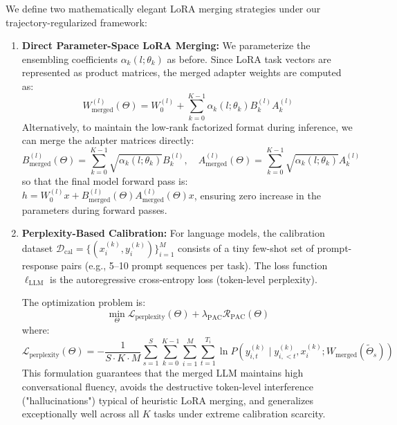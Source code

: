 We define two mathematically elegant LoRA merging strategies under our trajectory-regularized framework:
\begin{enumerate}
    \item \textbf{Direct Parameter-Space LoRA Merging:}
    We parameterize the ensembling coefficients $\alpha_k(l; \theta_k)$ as before. Since LoRA task vectors are represented as product matrices, the merged adapter weights are computed as:
    \begin{equation}
    W_{\text{merged}}^{(l)}(\Theta) = W_0^{(l)} + \sum_{k=0}^{K-1} \alpha_k(l; \theta_k) B_k^{(l)} A_k^{(l)}
    \end{equation}
    Alternatively, to maintain the low-rank factorized format during inference, we can merge the adapter matrices directly:
    \begin{equation}
    B_{\text{merged}}^{(l)}(\Theta) = \sum_{k=0}^{K-1} \sqrt{\alpha_k(l; \theta_k)} B_k^{(l)}, \quad A_{\text{merged}}^{(l)}(\Theta) = \sum_{k=0}^{K-1} \sqrt{\alpha_k(l; \theta_k)} A_k^{(l)}
    \end{equation}
    so that the final model forward pass is: $h = W_0^{(l)} x + B_{\text{merged}}^{(l)}(\Theta) A_{\text{merged}}^{(l)}(\Theta) x$, ensuring zero increase in the parameters during forward passes.
    \item \textbf{Perplexity-Based Calibration:}
    For language models, the calibration dataset $\mathcal{D}_{\text{cal}} = \{(x_i^{(k)}, y_i^{(k)})\}_{i=1}^M$ consists of a tiny few-shot set of prompt-response pairs (e.g., 5--10 prompt sequences per task). The loss function $\ell_{\text{LLM}}$ is the autoregressive cross-entropy loss (token-level perplexity).
    
    The optimization problem is:
    \begin{equation}
    \min_{\Theta} \mathcal{L}_{\text{perplexity}}(\Theta) + \lambda_{\text{PAC}} \mathcal{R}_{\text{PAC}}(\Theta)
    \end{equation}
    where:
    \begin{equation}
    \mathcal{L}_{\text{perplexity}}(\Theta) = -\frac{1}{S \cdot K \cdot M} \sum_{s=1}^S \sum_{k=0}^{K-1} \sum_{i=1}^M \sum_{t=1}^{T_i} \ln P\left(y_{i,t}^{(k)} \mid y_{i,<t}^{(k)}, x_i^{(k)}; W_{\text{merged}}(\tilde{\Theta}_s)\right)
    \end{equation}
    This formulation guarantees that the merged LLM maintains high conversational fluency, avoids the destructive token-level interference ("hallucinations") typical of heuristic LoRA merging, and generalizes exceptionally well across all $K$ tasks under extreme calibration scarcity.
\end{enumerate}


